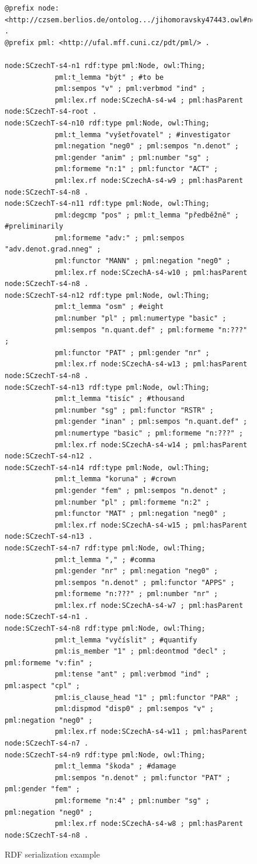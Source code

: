 \begin{figure}
\begin{verbatim}
@prefix node: <http://czsem.berlios.de/ontolog.../jihomoravsky47443.owl#node/> .
@prefix pml: <http://ufal.mff.cuni.cz/pdt/pml/> .

node:SCzechT-s4-n1 rdf:type pml:Node, owl:Thing;
			pml:t_lemma "být" ; #to be
			pml:sempos "v" ; pml:verbmod "ind" ; 
			pml:lex.rf node:SCzechA-s4-w4 ; pml:hasParent node:SCzechT-s4-root .
node:SCzechT-s4-n10 rdf:type pml:Node, owl:Thing;
			pml:t_lemma "vyšetřovatel" ; #investigator
			pml:negation "neg0" ; pml:sempos "n.denot" ;
			pml:gender "anim" ; pml:number "sg" ;
			pml:formeme "n:1" ; pml:functor "ACT" ;
			pml:lex.rf node:SCzechA-s4-w9 ; pml:hasParent node:SCzechT-s4-n8 .
node:SCzechT-s4-n11 rdf:type pml:Node, owl:Thing;
			pml:degcmp "pos" ; pml:t_lemma "předběžně" ; #preliminarily
			pml:formeme "adv:" ; pml:sempos "adv.denot.grad.nneg" ;
			pml:functor "MANN" ; pml:negation "neg0" ;
			pml:lex.rf node:SCzechA-s4-w10 ; pml:hasParent node:SCzechT-s4-n8 .
node:SCzechT-s4-n12 rdf:type pml:Node, owl:Thing;
			pml:t_lemma "osm" ; #eight
			pml:number "pl" ; pml:numertype "basic" ;
			pml:sempos "n.quant.def" ; pml:formeme "n:???" ;
			pml:functor "PAT" ; pml:gender "nr" ;
			pml:lex.rf node:SCzechA-s4-w13 ; pml:hasParent node:SCzechT-s4-n8 .
node:SCzechT-s4-n13 rdf:type pml:Node, owl:Thing;
			pml:t_lemma "tisíc" ; #thousand
			pml:number "sg" ; pml:functor "RSTR" ;
			pml:gender "inan" ; pml:sempos "n.quant.def" ;
			pml:numertype "basic" ; pml:formeme "n:???" ;
			pml:lex.rf node:SCzechA-s4-w14 ; pml:hasParent node:SCzechT-s4-n12 .
node:SCzechT-s4-n14 rdf:type pml:Node, owl:Thing;
			pml:t_lemma "koruna" ; #crown
			pml:gender "fem" ; pml:sempos "n.denot" ;
			pml:number "pl" ; pml:formeme "n:2" ;
			pml:functor "MAT" ; pml:negation "neg0" ;
			pml:lex.rf node:SCzechA-s4-w15 ; pml:hasParent node:SCzechT-s4-n13 .
node:SCzechT-s4-n7 rdf:type pml:Node, owl:Thing;
			pml:t_lemma "," ; #comma
			pml:gender "nr" ; pml:negation "neg0" ;
			pml:sempos "n.denot" ; pml:functor "APPS" ;
			pml:formeme "n:???" ; pml:number "nr" ;
			pml:lex.rf node:SCzechA-s4-w7 ; pml:hasParent node:SCzechT-s4-n1 .
node:SCzechT-s4-n8 rdf:type pml:Node, owl:Thing;
			pml:t_lemma "vyčíslit" ; #quantify
			pml:is_member "1" ; pml:deontmod "decl" ; pml:formeme "v:fin" ;
			pml:tense "ant" ; pml:verbmod "ind" ; pml:aspect "cpl" ;
			pml:is_clause_head "1" ; pml:functor "PAR" ;
			pml:dispmod "disp0" ; pml:sempos "v" ; pml:negation "neg0" ;
			pml:lex.rf node:SCzechA-s4-w11 ; pml:hasParent node:SCzechT-s4-n7 .
node:SCzechT-s4-n9 rdf:type pml:Node, owl:Thing;
			pml:t_lemma "škoda" ; #damage
			pml:sempos "n.denot" ; pml:functor "PAT" ; pml:gender "fem" ;
			pml:formeme "n:4" ; pml:number "sg" ; pml:negation "neg0" ;
			pml:lex.rf node:SCzechA-s4-w8 ; pml:hasParent node:SCzechT-s4-n8 .
\end{verbatim}
\caption{RDF serialization example}
\label{lst:rdf_serialization}
\end{figure}




